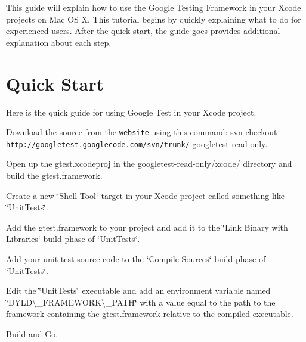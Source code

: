 This guide will explain how to use the Google Testing Framework in your Xcode projects on Mac OS X. This tutorial begins by quickly explaining what to do for experienced users. After the quick start, the guide goes provides additional explanation about each step.

\section*{Quick Start}

Here is the quick guide for using Google Test in your Xcode project.


\begin{DoxyEnumerate}
\item Download the source from the \href{http://code.google.com/p/googletest}{\tt website} using this command\+: {\ttfamily svn checkout \href{http://googletest.googlecode.com/svn/trunk/}{\tt http\+://googletest.\+googlecode.\+com/svn/trunk/} googletest-\/read-\/only}.
\end{DoxyEnumerate}
\begin{DoxyEnumerate}
\item Open up the {\ttfamily gtest.\+xcodeproj} in the {\ttfamily googletest-\/read-\/only/xcode/} directory and build the gtest.\+framework.
\end{DoxyEnumerate}
\begin{DoxyEnumerate}
\item Create a new \char`\"{}\+Shell Tool\char`\"{} target in your Xcode project called something like \char`\"{}\+Unit\+Tests\char`\"{}.
\end{DoxyEnumerate}
\begin{DoxyEnumerate}
\item Add the gtest.\+framework to your project and add it to the \char`\"{}\+Link Binary with Libraries\char`\"{} build phase of \char`\"{}\+Unit\+Tests\char`\"{}.
\end{DoxyEnumerate}
\begin{DoxyEnumerate}
\item Add your unit test source code to the \char`\"{}\+Compile Sources\char`\"{} build phase of \char`\"{}\+Unit\+Tests\char`\"{}.
\end{DoxyEnumerate}
\begin{DoxyEnumerate}
\item Edit the \char`\"{}\+Unit\+Tests\char`\"{} executable and add an environment variable named \char`\"{}\+D\+Y\+L\+D\textbackslash{}\+\_\+\+F\+R\+A\+M\+E\+W\+O\+R\+K\textbackslash{}\+\_\+\+P\+A\+T\+H\char`\"{} with a value equal to the path to the framework containing the gtest.\+framework relative to the compiled executable.
\end{DoxyEnumerate}
\begin{DoxyEnumerate}
\item Build and Go.
\end{DoxyEnumerate}

